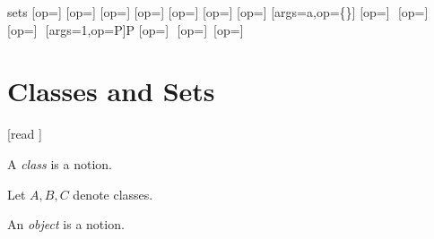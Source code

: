 \documentclass{article}
\begin{document}
\begin{smodule}{sets}
\STEXexport{
  \let\oldsubseteq\subseteq
  \let\subseteq\relax
  \let\oldsubset\subset
  \let\subset\relax
  \let\oldsupseteq\supseteq
  \let\supseteq\relax
  \let\oldsupset\supset
  \let\supset\relax
  \let\oldsubsetneq\subsetneq
  \let\subsetneq\relax
  \let\oldsupsetneq\supsetneq
  \let\supsetneq\relax
  \let\oldemptyset\emptyset
  \let\emptyset\relax
  \let\oldcup\cup
  \let\cup\relax
  \let\oldcap\cap
  \let\cap\relax
  \let\oldsetminus\setminus
  \let\setminus\relax
  \let\oldtimes\times
  \let\times\relax
  \let\oldbigcup\bigcup
  \let\bigcup\relax
  \let\oldbigcap\bigcap
  \let\bigcap\relax
}
[op=\oldsubseteq]{\;\oldsubseteq\;}
[op=\oldsubset]{\;\oldsubset\;}
[op=\oldsupseteq]{\;\oldsupseteq\;}
[op=\oldsupset]{\;\oldsupset\;}
[op=\oldsubsetneq]{\;\oldsubsetneq\;}
[op=\oldsupsetneq]{\;\oldsupsetneq\;}
[op=\oldemptyset]{\oldemptyset}
[args=a,op=\{\cdot\}]{\comp{\{}\comp{\}}}
[op=\oldcup]{\,\oldcup\,}
[op=\oldcap]{\,\oldcap\,}
[op=\oldsetminus]{\,\oldsetminus\,}
[args=1,op=\mathcal P]{\mathcal P}
[op=\oldtimes]{\,\oldtimes\,}
[op=\oldbigcup]{\oldbigcup\,}
[op=\oldbigcap]{\oldbigcap\,}

\section{Classes and Sets}

\begin{forthel}

  [read ]
\end{forthel}

\begin{signature*}
  A \emph{class} is a notion.
\end{signature*}

\begin{forthel}
  Let $A,B,C$ denote classes.
\end{forthel}

\begin{signature*}
  An \emph{object} is a notion.
\end{signature*}


\end{smodule}
\end{document}
